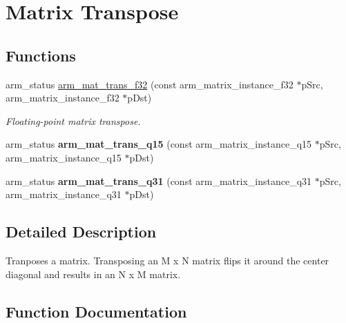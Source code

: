 \hypertarget{group__MatrixTrans}{}\section{Matrix Transpose}
\label{group__MatrixTrans}
\subsection*{Functions}
\begin{DoxyCompactItemize}
\item 
arm\+\_\+status \hyperlink{group__MatrixTrans_gad7dd9f108429da13d3864696ceeec789}{arm\+\_\+mat\+\_\+trans\+\_\+f32} (const arm\+\_\+matrix\+\_\+instance\+\_\+f32 $\ast$p\+Src, arm\+\_\+matrix\+\_\+instance\+\_\+f32 $\ast$p\+Dst)
\begin{DoxyCompactList}\small\item\em Floating-\/point matrix transpose. \end{DoxyCompactList}\item 
arm\+\_\+status {\bfseries arm\+\_\+mat\+\_\+trans\+\_\+q15} (const arm\+\_\+matrix\+\_\+instance\+\_\+q15 $\ast$p\+Src, arm\+\_\+matrix\+\_\+instance\+\_\+q15 $\ast$p\+Dst)\hypertarget{group__MatrixTrans_ga4f4f821cc695fd0ef9061d702e08050a}{}\label{group__MatrixTrans_ga4f4f821cc695fd0ef9061d702e08050a}

\item 
arm\+\_\+status {\bfseries arm\+\_\+mat\+\_\+trans\+\_\+q31} (const arm\+\_\+matrix\+\_\+instance\+\_\+q31 $\ast$p\+Src, arm\+\_\+matrix\+\_\+instance\+\_\+q31 $\ast$p\+Dst)\hypertarget{group__MatrixTrans_ga30a4d49489ac67ff98a46b9f58f73bf1}{}\label{group__MatrixTrans_ga30a4d49489ac67ff98a46b9f58f73bf1}

\end{DoxyCompactItemize}


\subsection{Detailed Description}
Tranposes a matrix. Transposing an {\ttfamily M x N} matrix flips it around the center diagonal and results in an {\ttfamily N x M} matrix. 

\subsection{Function Documentation}
